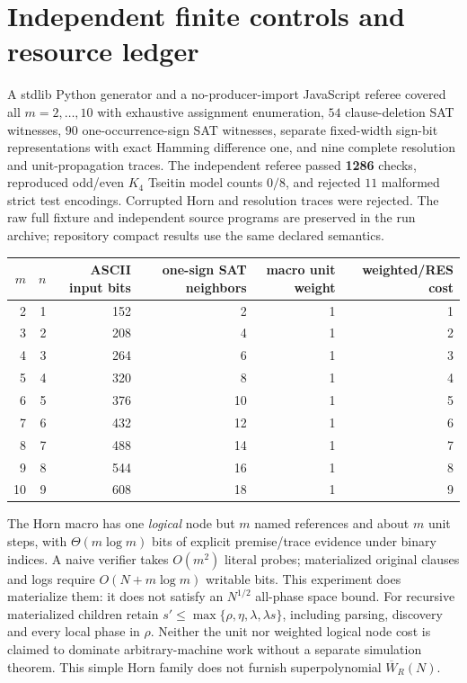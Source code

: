 \documentclass[11pt]{article}
\begin{document}
\section*{Independent finite controls and resource ledger}
A stdlib Python generator and a no-producer-import JavaScript referee covered all $m=2,\ldots,10$ with exhaustive assignment enumeration, $54$ clause-deletion SAT witnesses, $90$ one-occurrence-sign SAT witnesses, separate fixed-width sign-bit representations with exact Hamming difference one, and nine complete resolution and unit-propagation traces. The independent referee passed \textbf{1286} checks, reproduced odd/even $K_4$ Tseitin model counts $0/8$, and rejected $11$ malformed strict test encodings. Corrupted Horn and resolution traces were rejected. The raw full fixture and independent source programs are preserved in the run archive; repository compact results use the same declared semantics.

\begin{center}\begin{tabular}{rrrrrr}\toprule
$m$ & $n$ & ASCII input bits & one-sign SAT neighbors & macro unit weight & weighted/RES cost\\\midrule
2&1&152&2&1&1\\
3&2&208&4&1&2\\
4&3&264&6&1&3\\
5&4&320&8&1&4\\
6&5&376&10&1&5\\
7&6&432&12&1&6\\
8&7&488&14&1&7\\
9&8&544&16&1&8\\
10&9&608&18&1&9\\\bottomrule\end{tabular}\end{center}

The Horn macro has one \emph{logical} node but $m$ named references and about $m$ unit steps, with $\Theta(m\log m)$ bits of explicit premise/trace evidence under binary indices. A naive verifier takes $O(m^2)$ literal probes; materialized original clauses and logs require $O(N+m\log m)$ writable bits. This experiment does materialize them: it does not satisfy an $N^{1/2}$ all-phase space bound. For recursive materialized children retain $s'\le\max\{\rho,\eta,\lambda,\lambda s\}$, including parsing, discovery and every local phase in $\rho$. Neither the unit nor weighted logical node cost is claimed to dominate arbitrary-machine work without a separate simulation theorem. This simple Horn family does not furnish superpolynomial $\overline W_R(N)$.
\end{document}
